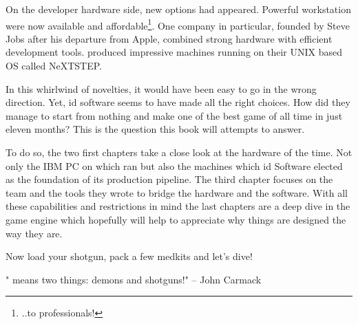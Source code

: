  \par
 On the developer hardware side, new options had appeared. Powerful workstation were now available and affordable\footnote{..to professionals!}. One company in particular, founded by Steve Jobs after his departure from Apple, combined strong hardware with efficient development tools. \NeXT produced impressive machines running on their UNIX based OS called NeXTSTEP.\\%
 \par
 In this whirlwind of novelties, it would have been easy to go in the wrong direction. Yet, id software seems to have made all the right choices. How did they manage to start from nothing and make one of the best game of all time in just eleven months? This is the question this book will attempts to answer.\\
 \par
 To do so, the two first chapters take a close look at the hardware of the time. Not only the IBM PC on which \doom{} ran but also the \NeXT machines which id Software elected as the foundation of its production pipeline. The third chapter focuses on the team and the tools they wrote to bridge the hardware and the software. With all these capabilities and restrictions in mind the last chapters are a deep dive in the game engine which hopefully will help to appreciate why things are designed the way they are.\\
\par
Now load your shotgun, pack a few medkits and let's dive!\\
\par
\centering "\doom{} means two things: demons and shotguns!" -- John Carmack

